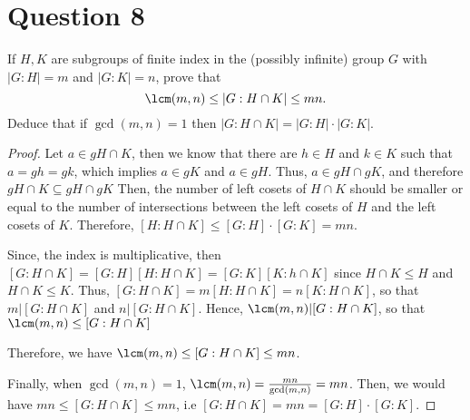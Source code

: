 \section{Question 8}

\begin{question}
    If $H, K$ are subgroups of finite index in the (possibly infinite) group $G$ with $|G: H|=m$ and $|G: K|=n$, prove that
    \begin{equation}
        \lcm(m, n) \leq|G: H \cap K| \leq m n .        
    \end{equation}
    Deduce that if $\gcd(m, n)=1$ then $|G: H \cap K|=|G: H| \cdot|G: K|$.
\end{question}

\begin{answer}
    \begin{proof}
        Let $a \in gH\cap K$, then we know that there are $h \in H$ and $k \in K$ such that $a = gh = gk$, which implies $a \in gK$ and $a \in gH$. Thus, $a \in gH \cap gK$, and therefore $gH\cap K \subseteq gH\cap gK$ Then, the number of left cosets of $H\cap K$ should be smaller or equal to the number of intersections between the left cosets of $H$ and the left cosets of $K$. Therefore, $[H:H\cap K] \leq [G:H]\cdot[G:K]=mn$.
        
        Since, the index is multiplicative, then $[G:H\cap K] = [G:H][H:H\cap K] = [G:K][K:h\cap K]$ since $H\cap K \leq H$ and $H\cap K \leq K$. Thus, $[G:H \cap K] = m[H:H\cap K] = n[K:H\cap K]$, so that $m \lvert [G:H\cap K]$ and $n \lvert [G:H\cap K]$. Hence, $\lcm(m,n)\lvert [G:H\cap K]$, so that $\lcm(m,n)\leq [G:H\cap K]$
        
        Therefore, we have $\lcm(m,n) \leq [G:H\cap K] \leq mn$.
        
        Finally, when $\gcd(m,n)=1$, $\lcm(m,n) = \tfrac{mn}{\gcd(m,n)} = mn$. Then, we would have $mn \leq [G:H\cap K] \leq mn$, i.e $[G:H\cap K] = mn = [G:H]\cdot[G:K]$.
    \end{proof}
\end{answer}
